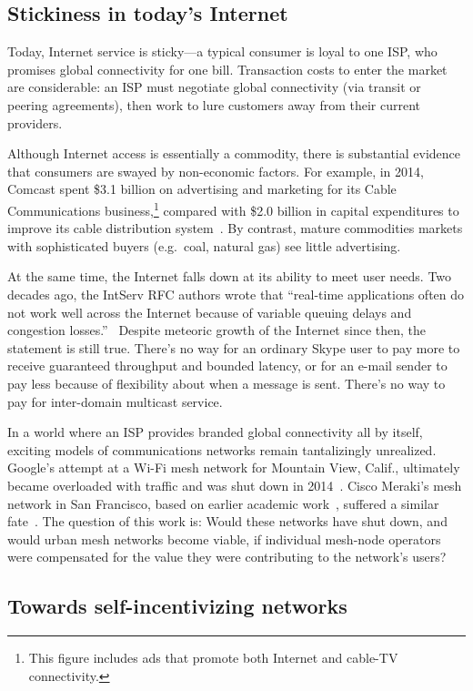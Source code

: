\subsection{Stickiness in today's Internet}

Today, Internet service is sticky---a typical consumer is loyal to one
ISP, who promises global connectivity for one bill. Transaction costs
to enter the market are considerable: an ISP must negotiate global
connectivity (via transit or peering agreements), then work to lure
customers away from their current providers.

Although Internet access is essentially a commodity, there is
substantial evidence that consumers are swayed by non-economic
factors. For example, in 2014, Comcast spent \$3.1 billion on advertising and
marketing for its Cable Communications business,\footnote{This figure
  includes ads that promote both Internet and cable-TV connectivity.}
compared with \$2.0 billion in capital expenditures to improve its
cable distribution system~\cite{comcastannualreport}. By contrast,
mature commodities markets with sophisticated buyers (e.g.~coal,
natural gas) see little advertising.

At the same time, the Internet falls down at its ability to meet user
needs. Two decades ago, the IntServ RFC authors wrote that ``real-time
applications often do not work well across the Internet because of
variable queuing delays and congestion losses.''~\cite{rfc1633}
Despite meteoric growth of the Internet since then, the statement is
still true. There's no way for an ordinary Skype user to pay more to receive
guaranteed throughput and bounded latency, or for an e-mail sender to
pay less because of flexibility about when a message is sent. There's no
way to pay for inter-domain multicast service.

In a world where an ISP provides branded global connectivity all by
itself, exciting models of communications networks remain
tantalizingly unrealized.  Google's attempt at a Wi-Fi mesh network
for Mountain View, Calif., ultimately became overloaded with traffic
and was shut down in 2014~\cite{pcworld13}. Cisco Meraki's mesh
network in San Francisco, based on earlier academic work~\cite{bicket05}, suffered a similar fate~\cite{economist14}.
The question of this work is: Would these networks have shut down, and
would urban mesh networks become viable, if individual mesh-node
operators were compensated for the value they were contributing
to the network's users?

\subsection{Towards self-incentivizing networks}
\label{ss:towards}

